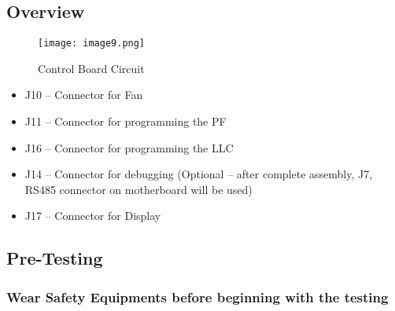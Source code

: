 \subsection{Overview}
\begin{figure}[H]
    \centering
    \texttt{[image: image9.png]}
    \caption{Control Board Circuit}
    \label{fig:image9}
\end{figure}
\begin{itemize}
    \item J10 – Connector for Fan
    \item J11 – Connector for programming the PF
    \item J16 – Connector for programming the LLC
    \item J14 – Connector for debugging (Optional – after complete assembly, J7, RS485 connector on motherboard will be used)
    \item J17 – Connector for Display
\end{itemize}

\subsection{Pre-Testing}

\subsubsection{Wear Safety Equipments before beginning with the testing}

